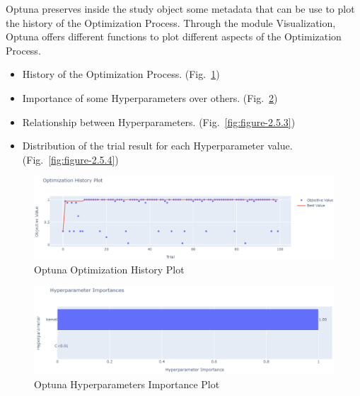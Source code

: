 Optuna preserves inside the study object some metadata that can be use to plot the history of the Optimization Process.
Through the module Visualization, Optuna offers different functions to plot different aspects of the Optimization Process.
\begin{itemize}[itemsep=0.1cm]
	\item History of the Optimization Process. (Fig.~\ref{fig:figure-2.5.1})
	\item Importance of some Hyperparameters over others. (Fig.~\ref{fig:figure-2.5.2})
	\item Relationship between Hyperparameters. (Fig.~\ref{fig:figure-2.5.3})
	\item Distribution of the trial result for each Hyperparameter value. (Fig.~\ref{fig:figure-2.5.4})
\end{itemize}
\begin{figure}[t]
	\centering
	\includegraphics[width=16cm]{figures/figure-2.5.1.png}
	\caption[Optuna Optimization History Plot]{Optuna Optimization History Plot}
	\label{fig:figure-2.5.1}
\end{figure}
\begin{figure}[t]
	\centering
	\includegraphics[width=16cm]{figures/figure-2.5.2.png}
	\caption[Optuna Hyperparameters Importance]{Optuna Hyperparameters Importance Plot}
	\label{fig:figure-2.5.2}
\end{figure}
